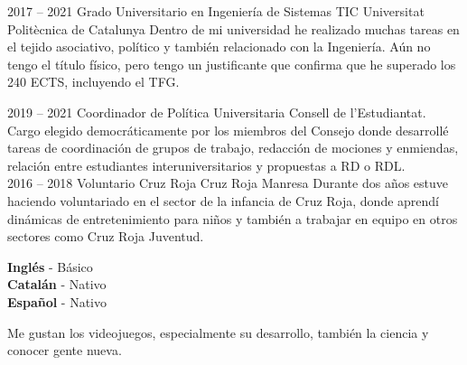 \documentclass[9pt]{developercv} %
\begin{document}
\begin{entrylist}
\end{entrylist}

\clearpage



\begin{entrylist}
	\entry
		{2017 -- 2021}
		{Grado Universitario en Ingeniería de Sistemas TIC}
		{Universitat Politècnica de Catalunya}
		{Dentro de mi universidad he realizado muchas tareas en el tejido asociativo, político y también relacionado con la Ingeniería. Aún no tengo el título físico, pero tengo un justificante que confirma que he superado los 240 ECTS, incluyendo el TFG.}
\end{entrylist}


\begin{entrylist}
	\entry
	{2019 -- 2021}
	{Coordinador de Política Universitaria}
	{Consell de l'Estudiantat.}
	{Cargo elegido democráticamente por los miembros del Consejo donde desarrollé tareas de coordinación de grupos de trabajo, redacción de mociones y enmiendas, relación entre estudiantes interuniversitarios y propuestas a RD o RDL. \\ }
	\entry
	{2016 -- 2018}
	{Voluntario Cruz Roja}
	{Cruz Roja Manresa}
	{Durante dos años estuve haciendo voluntariado en el sector de la infancia de Cruz Roja, donde aprendí dinámicas de entretenimiento para niños y también a trabajar en equipo en otros sectores como Cruz Roja Juventud. \\ }
\end{entrylist}


\begin{minipage}[t]{0.3\textwidth}
	\vspace{-\baselineskip} %

	
	\textbf{Inglés} - Básico\\
	\textbf{Catalán} - Nativo\\
	\textbf{Español} - Nativo\\
\end{minipage}
\hfill
\begin{minipage}[t]{0.3\textwidth}
	\vspace{-\baselineskip} %
	
	
	Me gustan los videojuegos, especialmente su desarrollo, también la ciencia y conocer gente nueva.
	
\end{minipage}
\hfill

\end{document}
